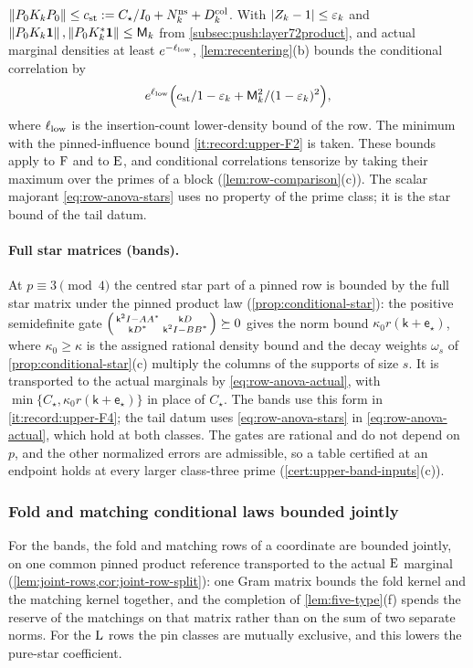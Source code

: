 $\left\|P_0K_kP_0\right\|\le c_{\rm st}:=C_\star/I_0+N^{\rm ns}_k+D^{\rm col}_k$. With
$|Z_k-1|\le\varepsilon_k$ and $\left\|P_0K_k\mathbf 1\right\|,\left\|P_0K_k^*\mathbf 1\right\|\le\mathsf M_k$ from
\cref{subsec:push:layer72product}, and actual marginal densities at least
$e^{-\ell_{\rm low}}$, \cref{lem:recentering}(b) bounds the conditional correlation by
\begin{equation}\label{eq:row-anova-actual}
 e^{\ell_{\rm low}}\Bigl(c_{\rm st}/1-\varepsilon_k+\mathsf M_k^2/(1-\varepsilon_k)^2\Bigr),
\end{equation}
where $\ell_{\rm low}$ is the insertion-count lower-density bound of the row. The minimum
with the pinned-influence bound \ref{it:record:upper-F2} is taken. These bounds apply to
$\rm F$ and to $\rm E$, and conditional correlations tensorize by taking their maximum
over the primes of a block (\cref{lem:row-comparison}(c)). The scalar majorant
\eqref{eq:row-anova-stars} uses no property of the prime class; it is the star bound of
the tail datum.

\paragraph{Full star matrices (bands).} At $p\equiv3\pmod4$ the centred star part of a
pinned row is bounded by the full star matrix under the pinned product law
(\cref{prop:conditional-star}): the positive semidefinite gate
$\begin{psmallmatrix}\mathsf k^2I-AA^*&\mathsf kD\\\mathsf kD^*&\mathsf k^2I-BB^*\end{psmallmatrix}
\succeq0$ gives the norm bound $\kappa_0r(\mathsf k+\mathsf e_\star)$, where $\kappa_0\ge\kappa$
is the assigned rational density bound and the decay weights $\omega_s$ of
\cref{prop:conditional-star}(c) multiply the columns of the supports of size $s$. It is
transported to the actual marginals by \eqref{eq:row-anova-actual}, with
$\min\{C_\star,\kappa_0r(\mathsf k+\mathsf e_\star)\}$ in place of $C_\star$. The bands use
this form in \ref{it:record:upper-F4}; the tail datum uses
\eqref{eq:row-anova-stars} in \eqref{eq:row-anova-actual}, which hold at both classes.
The gates are rational and do not depend on $p$, and the other normalized errors are
admissible, so a table certified at an endpoint holds at every larger class-three prime
(\cref{cert:upper-band-inputs}(c)).

\subsubsection{Fold and matching conditional laws bounded jointly}\label{subsec:upper-joint-rows}
For the bands, the fold and matching rows of a coordinate are bounded jointly, on one
common pinned product reference transported to the actual $\rm E$ marginal
(\cref{lem:joint-rows,cor:joint-row-split}): one Gram matrix bounds the fold kernel and
the matching kernel together, and the completion of \cref{lem:five-type}(f) spends the
reserve of the matchings on that matrix rather than on the sum of two separate norms.
For the $\rm L$ rows the pin classes are mutually exclusive, and this lowers the
pure-star coefficient.


